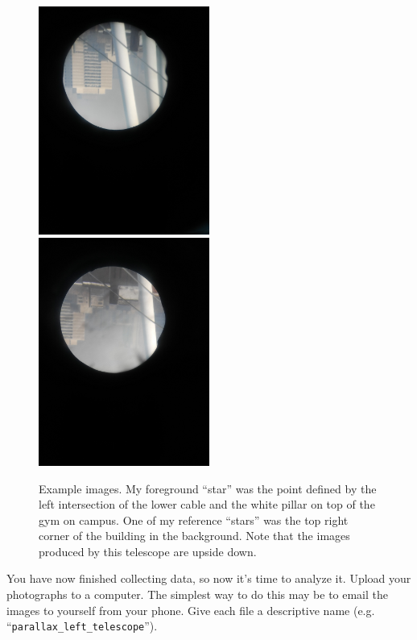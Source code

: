 \begin{figure}
	\includegraphics[width=0.5\textwidth]{parallax/parallax-image-1}
	\includegraphics[width=0.5\textwidth]{parallax/parallax-image-2}
	\caption{Example images. My foreground ``star'' was the point defined by the left intersection of the lower cable and the white pillar on top of the gym on campus. One of my reference ``stars'' was the top right corner of the building in the background. Note that the images produced by this telescope are upside down.}\label{par:fig:images}
\end{figure}

You have now finished collecting data, so now it’s time to analyze it. Upload your
photographs to a computer. The simplest way to do this may be to email the images to
yourself from your phone. Give each file a descriptive name (e.g. ``\texttt{parallax\_left\_telescope}'').


